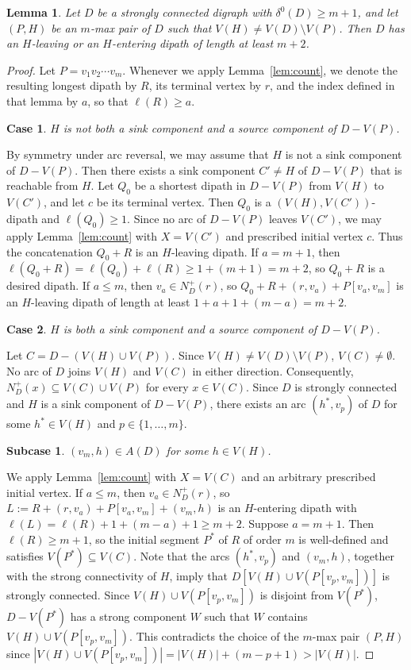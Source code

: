 \documentclass[12pt]{article}
\numberwithin{equation}{section}
\theoremstyle{plain}
\newtheorem{lemma}[theorem]{Lemma}
\newtheorem{case}{Case}
\newtheorem{subcase}{Subcase}[case]
\theoremstyle{definition}
\begin{document}
\begin{lemma}\label{lem:leaving-H}
Let $D$ be a strongly connected digraph with $\delta^0(D)\ge m+1$, and let $(P,H)$ be an $m$-max pair of $D$ such that $V(H)\ne V(D)\setminus V(P)$.
Then $D$ has an $H$-leaving or an $H$-entering dipath of length at least $m+2$.
\end{lemma}
\begin{proof}
Let $P=v_1v_2\cdots v_m$.
Whenever we apply Lemma~\ref{lem:count}, we denote the resulting longest dipath by $R$, its terminal vertex by $r$, and the index defined in that lemma by $a$, so that $\ell(R)\ge a$.

\setcounter{case}{0}
\begin{case}
$H$ is not both a sink component and a source component of $D-V(P)$.
\end{case}
By symmetry under arc reversal, we may assume that $H$ is not a sink component of $D-V(P)$.
Then there exists a sink component $C'\ne H$ of $D-V(P)$ that is reachable from $H$.
Let $Q_0$ be a shortest dipath in $D-V(P)$ from $V(H)$ to $V(C')$, and let $c$ be its terminal vertex.
Then $Q_0$ is a $(V(H),V(C'))$-dipath and $\ell(Q_0)\ge 1$.
Since no arc of $D-V(P)$ leaves $V(C')$, we may apply Lemma~\ref{lem:count} with $X=V(C')$ and prescribed initial vertex $c$.
Thus the concatenation $Q_0+R$ is an $H$-leaving dipath.
If $a=m+1$, then $\ell(Q_0+R)=\ell(Q_0)+\ell(R)\ge 1+(m+1)=m+2$, so $Q_0+R$ is a desired dipath.
If $a\le m$, then $v_a\in N^+_D(r)$, so $Q_0+R+(r,v_a)+P[v_a,v_m]$ is an $H$-leaving dipath of length at least $1+a+1+(m-a)=m+2$.

\begin{case}
 $H$ is both a sink component and a source component of $D-V(P)$.
\end{case}
Let $C=D-(V(H)\cup V(P))$.
Since $V(H)\ne V(D)\setminus V(P)$, $V(C)\ne\emptyset$.
No arc of $D$ joins $V(H)$ and $V(C)$ in either direction.
Consequently, $N_D^+(x)\subseteq V(C)\cup V(P)$ for every $x\in V(C)$.
Since $D$ is strongly connected and $H$ is a sink component of $D-V(P)$, there exists an arc $(h^*,v_p)$ of $D$ for some $h^*\in V(H)$ and $p\in\{1,\ldots,m\}$.

\begin{subcase}
 $(v_m,h)\in A(D)$ for some $h\in V(H)$. 
\end{subcase}
We apply Lemma~\ref{lem:count} with $X=V(C)$ and an arbitrary prescribed initial vertex.
If $a\le m$, then $v_a\in N_D^+(r)$, so $L:=R+(r,v_a)+P[v_a,v_m]+(v_m,h)$ is an $H$-entering dipath with $\ell(L)=\ell(R)+1+(m-a)+1\ge m+2$.
Suppose $a=m+1$.
Then $\ell(R)\ge m+1$, so the initial segment $P^*$ of $R$ of order $m$ is well-defined and satisfies $V(P^*)\subseteq V(C)$.
Note that the arcs $(h^*,v_p)$ and $(v_m,h)$, together with the strong connectivity of $H$, imply that $D[V(H)\cup V(P[v_p,v_m])]$ is strongly connected.
Since $V(H)\cup V(P[v_p,v_m])$ is disjoint from $V(P^*)$, $D-V(P^*)$ has a strong component $W$ such that $W$ contains $V(H)\cup V(P[v_p,v_m])$.
This contradicts the choice of the $m$-max pair $(P,H)$ since $|V(H)\cup V(P[v_p,v_m])|=|V(H)|+(m-p+1)>|V(H)|$.


\end{proof}
\end{document}
